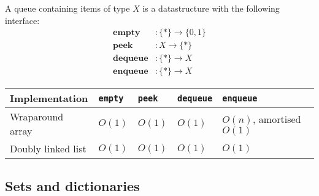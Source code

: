 \documentclass{article}
\begin{document}
\begin{definition}
	A queue containing items of type $X$ is a datastructure with
	the following interface:
	\begin{align*}
		\textbf{empty} &: \{*\}\to\{0, 1\}\\
		\textbf{peek} &: X \to \{*\}\\
		\textbf{dequeue} &: \{*\}\to X\\
		\textbf{enqueue} &: \{*\}\to X
	\end{align*}
\end{definition}

\begin{center}
\begin{tabular}{ l | l | l | l | l}
	\textbf{Implementation} 
	& \texttt{empty} 
	& \texttt{peek} 
	& \texttt{dequeue}
	& \texttt{enqueue}
	\\
	\hline
	Wraparound array
	& $O(1)$
	& $O(1)$
	& $O(1)$
	& $O(n)$, amortised $O(1)$
	\\
	\hline
	Doubly linked list
	& $O(1)$
	& $O(1)$
	& $O(1)$
	& $O(1)$
\end{tabular}
\end{center}

\subsection{Sets and dictionaries}
\end{document}
